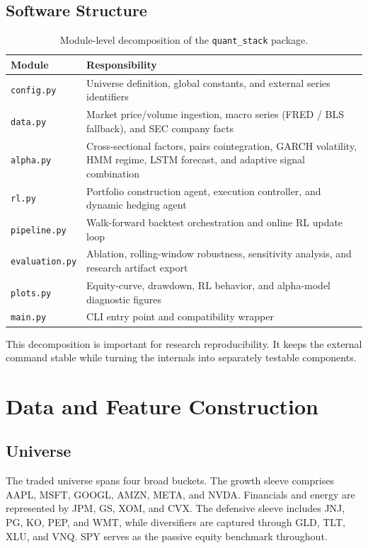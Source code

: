 \documentclass[10pt,twocolumn]{article}
\begin{document}
\subsection{Software Structure}

\begin{table}[t]
\centering
\caption{Module-level decomposition of the \texttt{quant\_stack} package.}
\begin{tabular}{@{} l p{11.5cm} @{}}
\toprule
\textbf{Module} & \textbf{Responsibility} \\
\midrule
\texttt{config.py}   & Universe definition, global constants, and external series identifiers \\
\texttt{data.py}     & Market price/volume ingestion, macro series (FRED / BLS fallback), and SEC company facts \\
\texttt{alpha.py}    & Cross-sectional factors, pairs cointegration, GARCH volatility, HMM regime, LSTM forecast, and adaptive signal combination \\
\texttt{rl.py}       & Portfolio construction agent, execution controller, and dynamic hedging agent \\
\texttt{pipeline.py} & Walk-forward backtest orchestration and online RL update loop \\
\texttt{evaluation.py} & Ablation, rolling-window robustness, sensitivity analysis, and research artifact export \\
\texttt{plots.py}    & Equity-curve, drawdown, RL behavior, and alpha-model diagnostic figures \\
\texttt{main.py}     & CLI entry point and compatibility wrapper \\
\bottomrule
\end{tabular}
\end{table}

This decomposition is important for research reproducibility. It keeps the
external command stable while turning the internals into separately testable
components.

\section{Data and Feature Construction}

\subsection{Universe}

The traded universe spans four broad buckets. The growth sleeve comprises AAPL,
MSFT, GOOGL, AMZN, META, and NVDA. Financials and energy are represented by JPM,
GS, XOM, and CVX. The defensive sleeve includes JNJ, PG, KO, PEP, and WMT, while
diversifiers are captured through GLD, TLT, XLU, and VNQ. SPY serves as the
passive equity benchmark throughout.
\end{document}
